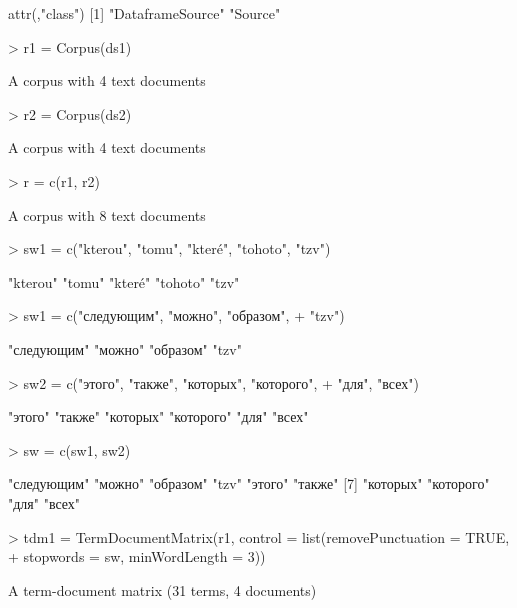 \documentclass[a4paper,11pt]{scrartcl}
\begin{document}
\begin{Schunk}
\begin{Soutput}
attr(,"class")
[1] "DataframeSource" "Source"         
\end{Soutput}
\begin{Sinput}
> r1 = Corpus(ds1)
\end{Sinput}
\begin{Soutput}
A corpus with 4 text documents
\end{Soutput}
\begin{Sinput}
> r2 = Corpus(ds2)
\end{Sinput}
\begin{Soutput}
A corpus with 4 text documents
\end{Soutput}
\begin{Sinput}
> r = c(r1, r2)
\end{Sinput}
\begin{Soutput}
A corpus with 8 text documents
\end{Soutput}
\begin{Sinput}
> sw1 = c("kterou", "tomu", "které", "tohoto", "tzv")
\end{Sinput}
\begin{Soutput}
[1] "kterou" "tomu"   "které"  "tohoto" "tzv"   
\end{Soutput}
\begin{Sinput}
> sw1 = c("следующим", "можно", "образом", 
+     "tzv")
\end{Sinput}
\begin{Soutput}
[1] "следующим" "можно"     "образом"   "tzv"      
\end{Soutput}
\begin{Sinput}
> sw2 = c("этого", "также", "которых", "которого", 
+     "для", "всех")
\end{Sinput}
\begin{Soutput}
[1] "этого"    "также"    "которых"  "которого" "для"      "всех"    
\end{Soutput}
\begin{Sinput}
> sw = c(sw1, sw2)
\end{Sinput}
\begin{Soutput}
 [1] "следующим" "можно"     "образом"   "tzv"       "этого"     "также"    
 [7] "которых"   "которого"  "для"       "всех"     
\end{Soutput}
\begin{Sinput}
> tdm1 = TermDocumentMatrix(r1, control = list(removePunctuation = TRUE, 
+     stopwords = sw, minWordLength = 3))
\end{Sinput}
\begin{Soutput}
A term-document matrix (31 terms, 4 documents)


\end{Soutput}
\end{Schunk}
\end{document}
